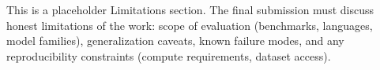 
This is a placeholder Limitations section. The final submission must
discuss honest limitations of the work: scope of evaluation
(benchmarks, languages, model families), generalization caveats,
known failure modes, and any reproducibility constraints (compute
requirements, dataset access).
